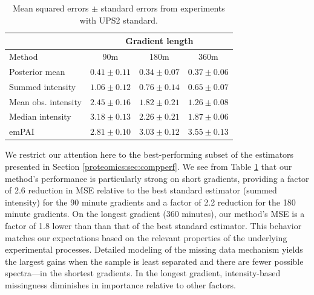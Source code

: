 \begin{table}
\centering
\caption{Mean squared errors $\pm$ standard errors from experiments with UPS2 standard.
\label{proteomics:tab:UPS2 results}}
\begin{tabular}{l|ccc}
\hline
& \multicolumn{3}{c}{Gradient length} \\
  \hline
Method & 90m & 180m & 360m \\ 
  \hline
Posterior mean & $0.41 \pm 0.11$ & $0.34 \pm 0.07$ & $0.37 \pm 0.06$ \\ 
  Summed intensity & $1.06 \pm 0.12$ & $0.76 \pm 0.14$ & $0.65 \pm 0.07$ \\ 
  Mean obs. intensity & $2.45 \pm 0.16$ & $1.82 \pm 0.21$ & $1.26 \pm 0.08$ \\ 
  Median intensity & $3.18 \pm 0.13$ & $2.26 \pm 0.21$ & $1.87 \pm 0.06$ \\ 
  emPAI & $2.81 \pm 0.10$ & $3.03 \pm 0.12$ & $3.55 \pm 0.13$ \\ 
   \hline
\end{tabular}
\end{table}
%
We restrict our attention here to the best-performing subset of the estimators presented in Section \ref{proteomics:sec:compperf}.
We see from Table \ref{proteomics:tab:UPS2 results} that our method's performance is particularly strong on short gradients, providing a factor of 2.6 reduction in MSE relative to the best standard estimator (summed intensity) for the 90 minute gradients and a factor of 2.2 reduction for the 180 minute gradients.
On the longest gradient (360 minutes), our method's MSE is a factor of 1.8 lower than than that of the best standard estimator.
This behavior matches our expectations based on the relevant properties of the underlying experimental processes.
Detailed modeling of the missing data mechanism yields the largest gains when the sample is least separated and there are fewer possible spectra---in the shortest gradients.
In the longest gradient, intensity-based missingness diminishes in importance relative to other factors.


